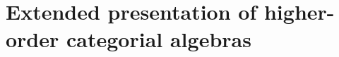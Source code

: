 \documentclass{amsart}
\theoremstyle{plain}
\newtheorem{proposition}[theorem]{Proposition}
\theoremstyle{definition}
\begin{document}
%
%

\section{Extended presentation of higher-order categorial algebras}\label{SExtended}
\end{document}
